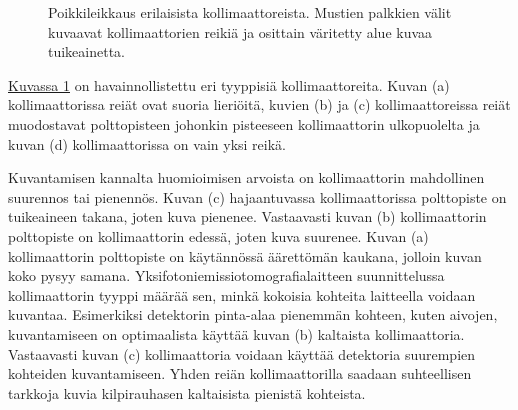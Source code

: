 \begin{figure}[H]
    \centering
    \captionsetup{width=.9\textwidth}
    \begin{subfigure}[t]{.4\textwidth}
        \resizebox{\linewidth}{!}{}
        \caption{}
    \end{subfigure}%
    \hspace{.1\textwidth}%
    \begin{subfigure}[t]{.4\textwidth}
        \resizebox{\linewidth}{!}{}
        \caption{}
    \end{subfigure}
    \begin{subfigure}[b]{.4\textwidth}
        \resizebox{\linewidth}{!}{}
        \caption{}
    \end{subfigure}%
    \hspace{.1\textwidth}%
    \begin{subfigure}[b]{.4\textwidth}
        \resizebox{\linewidth}{!}{}
        \caption{}
    \end{subfigure}
    \caption{Poikkileikkaus erilaisista kollimaattoreista. Mustien palkkien välit kuvaavat kollimaattorien reikiä ja osittain väritetty alue kuvaa tuikeainetta.}
    \label{fig:kollimaattorit}
\end{figure}

\hyperref[fig:kollimaattorit]{Kuvassa \ref*{fig:kollimaattorit}} on havainnollistettu eri tyyppisiä kollimaattoreita. Kuvan (a) kollimaattorissa reiät ovat suoria lieriöitä, kuvien (b) ja (c) kollimaattoreissa reiät muodostavat polttopisteen johonkin pisteeseen kollimaattorin ulkopuolelta ja kuvan (d) kollimaattorissa on vain yksi reikä.

Kuvantamisen kannalta huomioimisen arvoista on kollimaattorin mahdollinen suurennos tai pienennös. Kuvan (c) hajaantuvassa kollimaattorissa polttopiste on tuikeaineen takana, joten kuva pienenee. Vastaavasti kuvan (b) kollimaattorin polttopiste on kollimaattorin edessä, joten kuva suurenee. Kuvan (a) kollimaattorin polttopiste on käytännössä äärettömän kaukana, jolloin kuvan koko pysyy samana.\cite{cherry_gamma_2012, van_audenhaege_review_2015} Yksifotoniemissiotomografialaitteen suunnittelussa kollimaattorin tyyppi määrää sen, minkä kokoisia kohteita laitteella voidaan kuvantaa. Esimerkiksi detektorin pinta-alaa pienemmän kohteen, kuten aivojen, kuvantamiseen on optimaalista käyttää kuvan (b) kaltaista kollimaattoria. Vastaavasti kuvan (c) kollimaattoria voidaan käyttää detektoria suurempien kohteiden kuvantamiseen. Yhden reiän kollimaattorilla saadaan suhteellisen tarkkoja kuvia kilpirauhasen kaltaisista pienistä kohteista.\cite{van_audenhaege_review_2015, cherry_single_2012}

